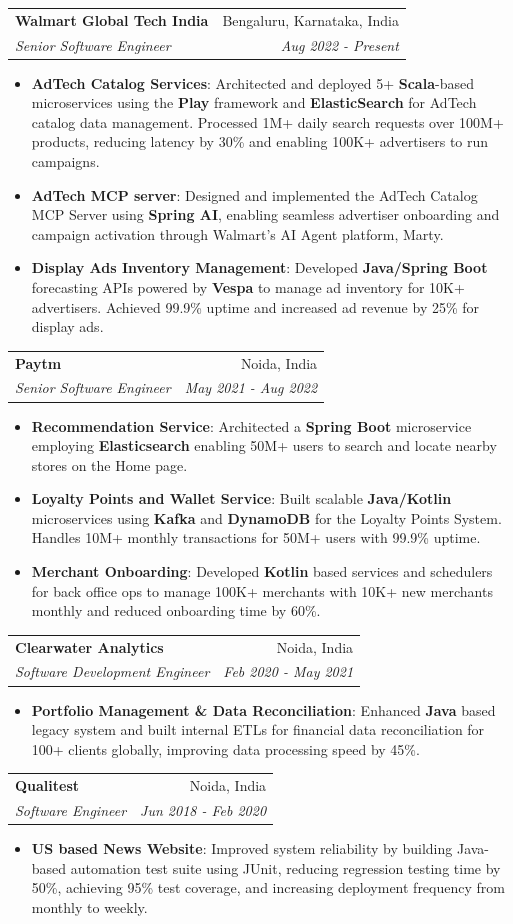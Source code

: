 \documentclass[letterpaper,11pt]{article}
\makeatletter
\newcommand{\resumeItem}[2]{
    \item\small{
        \textbf{#1}{: #2 \vspace{-2pt}}
    }
}
\newcommand{\resumeSubheading}[4]{
    \vspace{-1pt}\item
    \begin{tabular*}{0.97\textwidth}[t]{l@{\extracolsep{\fill}}r}
        \textbf{#1}       & #2                 \\
        \textit{\small#3} & \textit{\small #4} \\
    \end{tabular*}\vspace{-5pt}
}
\newcommand{\resumeItemListStart}{\begin{itemize}}
\newcommand{\resumeItemListEnd}{\end{itemize}\vspace{-5pt}}
\makeatother
\begin{document}
\resumeSubheading
{Walmart Global Tech India}{Bengaluru, Karnataka, India}
{Senior Software Engineer}{Aug 2022 - Present}
\resumeItemListStart
\resumeItem{AdTech Catalog Services}
{Architected and deployed 5+ \textbf{Scala}-based microservices using the \textbf{Play} framework and \textbf{ElasticSearch} for AdTech catalog data management. Processed 1M+ daily search requests over 100M+ products, reducing latency by 30\% and enabling 100K+ advertisers to run campaigns.}
\resumeItem{AdTech MCP server}
{Designed and implemented the AdTech Catalog MCP Server using \textbf{Spring AI}, enabling seamless advertiser onboarding and campaign activation through Walmart’s AI Agent platform, Marty.}
\resumeItem{Display Ads Inventory Management}
{Developed \textbf{Java/Spring Boot} forecasting APIs powered by \textbf{Vespa} to manage ad inventory for 10K+ advertisers. Achieved 99.9\% uptime and increased ad revenue by 25\% for display ads.}
\resumeItemListEnd
\resumeSubheading
{Paytm}{Noida, India}
{Senior Software Engineer}{May 2021 - Aug 2022}
\resumeItemListStart
\resumeItem{Recommendation Service}
{Architected a \textbf{Spring Boot} microservice employing \textbf{Elasticsearch} enabling 50M+ users to search and locate nearby stores on the Home page.}
\resumeItem{Loyalty Points and Wallet Service}
{Built scalable \textbf{Java/Kotlin} microservices using \textbf{Kafka} and \textbf{DynamoDB} for the Loyalty Points System. Handles 10M+ monthly transactions for 50M+ users with 99.9\% uptime.}
\resumeItem{Merchant Onboarding}
{Developed \textbf{Kotlin} based services and schedulers for back office ops to manage 100K+ merchants with 10K+ new merchants monthly and reduced onboarding time by 60\%.}
\resumeItemListEnd

\resumeSubheading
{Clearwater Analytics}{Noida, India}
{Software Development Engineer}{Feb 2020 - May 2021}
\resumeItemListStart
\resumeItem{Portfolio Management \& Data Reconciliation}
{Enhanced \textbf{Java} based legacy system and built internal ETLs for financial data reconciliation for 100+ clients globally, improving data processing speed by 45\%.}
\resumeItemListEnd

\resumeSubheading
{Qualitest}{Noida, India}
{Software Engineer}{Jun 2018 - Feb 2020}
\resumeItemListStart
\resumeItem{US based News Website}
{Improved system reliability by building Java-based automation test suite using JUnit, reducing regression testing time by 50\%, achieving 95\% test coverage, and increasing deployment frequency from monthly to weekly.}
\resumeItemListEnd
\end{document}
